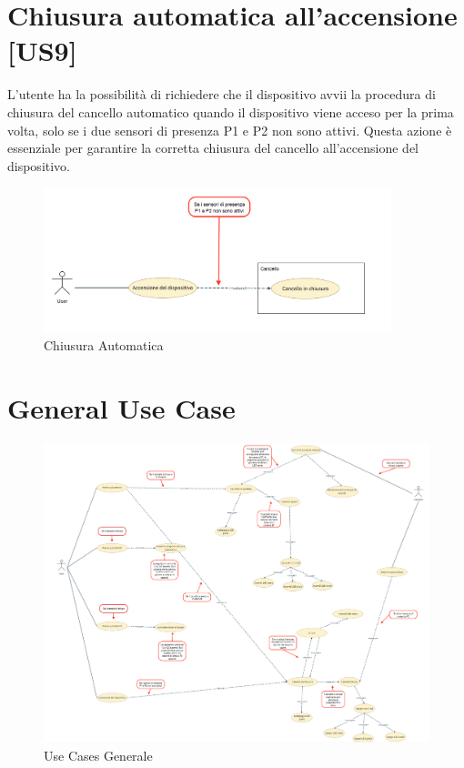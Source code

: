\section{Chiusura automatica all'accensione [US9]}
L'utente ha la possibilità di richiedere che il dispositivo avvii la procedura di chiusura del cancello automatico quando il dispositivo viene acceso per la prima volta, solo se i due sensori di presenza P1 e P2 non sono attivi.
Questa azione è essenziale per garantire la corretta chiusura del cancello all'accensione del dispositivo.


\begin{figure}[H]
    \centering
    \includegraphics[width=0.9\textwidth]{figures/usecase_9.png}
    \caption{Chiusura Automatica}
    \label{usecase9}
\end{figure}


\section{General Use Case}
\begin{figure}[H]
    \centering
    \includegraphics[width=1\linewidth]{figures/generalusecases.png}
    \caption{Use Cases Generale}
    \label{general}
\end{figure}
